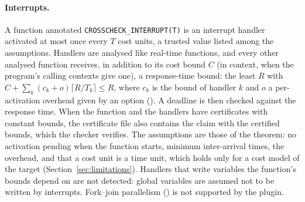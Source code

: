 \documentclass[oneside,english]{amsart}
\numberwithin{equation}{section}
\numberwithin{figure}{section}
\theoremstyle{plain}
\theoremstyle{definition}
\theoremstyle{plain}
\theoremstyle{remark}
\theoremstyle{plain}
\theoremstyle{definition}
\theoremstyle{plain}
\theoremstyle{remark}
\begin{document}
\paragraph{Interrupts.}
A function annotated \texttt{CROSSCHECK\_INTERRUPT(T)} is an interrupt handler activated at most once every $T$ cost units, a trusted value listed among the assumptions. Handlers are analysed like real-time functions, and every other analysed function receives, in addition to its cost bound $C$ (in context, when the program's calling contexts give one), a response-time bound: the least $R$ with $C + \sum_k (c_k + o)\lceil R/T_k\rceil \le R$, where $c_k$ is the bound of handler $k$ and $o$ a per-activation overhead given by an option (\cite[Theorem~\ref{I-thm:response-time}]{crosscheckTheory}). A deadline is then checked against the response time. When the function and the handlers have certificates with constant bounds, the certificate file also contains the claim with the certified bounds, which the checker verifies. The assumptions are those of the theorem: no activation pending when the function starts, minimum inter-arrival times, the overhead, and that a cost unit is a time unit, which holds only for a cost model of the target (Section~\ref{sec:limitations}). Handlers that write variables the function's bounds depend on are not detected: global variables are assumed not to be written by interrupts. Fork--join parallelism (\cite[Proposition~\ref{I-prop:graham}]{crosscheckTheory}) is not supported by the plugin.
\end{document}
